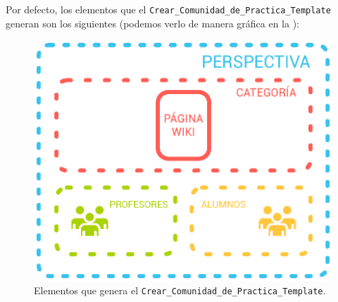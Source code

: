 Por defecto, los elementos que el \profile{} \texttt{Crear\_Comunidad\_de\_Practica\_Template} generan son los siguientes (podemos verlo de manera gráfica en la ):

\begin{figure}
\centering
\includegraphics[width=.8\linewidth]{../graphics/fig_explicacion_profile_comunidad.eps}
\caption{Elementos que genera el \profile{} \texttt{Crear\_Comunidad\_de\_Practica\_Template}.}\label{fig:explicacion_profile_comunidad}
\end{figure}


